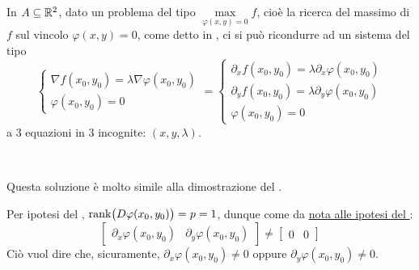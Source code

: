 \begin{example}
	\label{ex:molt_lagr_sist_equiv}
	In $A \subseteq \mathbb{R}^2$, dato un problema del tipo $\max\limits_{\varphi(x,y)=0} f$, cioè la ricerca del massimo di $f$ sul vincolo $\varphi(x,y)=0$, come detto in , ci si può ricondurre ad un sistema del tipo
	\[
		\begin{cases}
			\nabla f(x_0,y_0) = \lambda \nabla \varphi(x_0,y_0)\\
			\varphi(x_0,y_0)=0
		\end{cases}
		=
		\begin{cases}
			\partial_xf(x_0,y_0) = \lambda \partial_x \varphi(x_0,y_0)\\
			\partial_yf(x_0,y_0) = \lambda \partial_y\varphi(x_0,y_0)\\
			\varphi(x_0,y_0)=0
		\end{cases}
	\]
	a 3 equazioni in 3 incognite: $(x, y, \lambda)$.
	\begin{solution}~
		\begin{note}
			Questa soluzione è molto simile alla dimostrazione del .
		\end{note}
		Per ipotesi del , $\operatorname{rank} \bigl( D\varphi(x_0, y_0) \bigr) = p = 1$, dunque come da \hyperlink{note:teo_molt_lagr_gen}{nota alle ipotesi del }:
		\[
			\begin{bmatrix}
				\partial_x\varphi(x_0,y_0) & \partial_y\varphi(x_0,y_0)
			\end{bmatrix}
			\neq
			\begin{bmatrix}
				0 & 0
			\end{bmatrix}
		\]
		Ciò vuol dire che, sicuramente, $\partial_x \varphi(x_0,y_0) \neq 0$ oppure $\partial_y \varphi(x_0,y_0) \neq 0$.


\end{solution}
\end{example}
